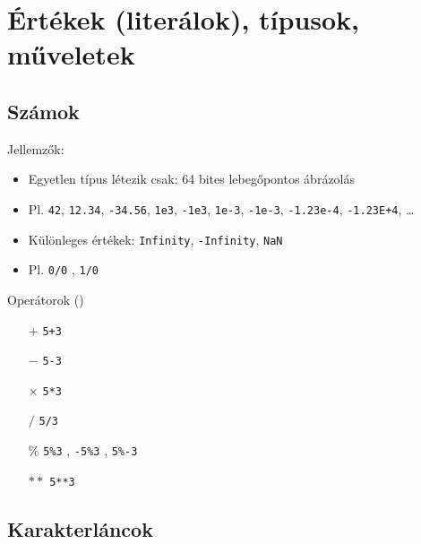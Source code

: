 \section{Értékek (literálok), típusok, műveletek}

\subsection{Számok}

\begin{frame}
    Jellemzők:
    \begin{itemize}
        \item Egyetlen típus létezik csak: 64 bites lebegőpontos ábrázolás
        \item Pl. \texttt{42}, \texttt{12.34}, \texttt{-34.56}, \texttt{1e3}, \texttt{-1e3}, \texttt{1e-3}, \texttt{-1e-3}, \texttt{-1.23e-4}, \texttt{-1.23E+4}, \dots
        \item Különleges értékek: \texttt{Infinity}, \texttt{-Infinity}, \texttt{NaN}
        \item Pl. \texttt{0/0} , \texttt{1/0} 
    \end{itemize}
    \vfill
    Operátorok ()
    \begin{itemize}
        \item[$+$] \texttt{5+3} 
        \item[$-$] \texttt{5-3}  
        \item[$\times$] \texttt{5*3} 
        \item[$/$] \texttt{5/3} 
        \item[$\%$] \texttt{5\%3} , \texttt{-5\%3} , \texttt{5\%-3}  
        \item[$**$] \texttt{5**3}  
    \end{itemize}
\end{frame}

\subsection{Karakterláncok}

